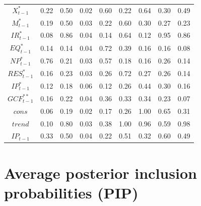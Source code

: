 \documentclass[a4paper, twoside]{templates/ociamthesis}
\begin{document}
\begin{table}[!ht]
\begin{tabular}[t]{ccccccccc}
$X^*_{t-1}$ & 0.22 & 0.50 & 0.02 & 0.60 & 0.22 & 0.64 & 0.30 & 0.49\\
$M^*_{t-1}$ & 0.19 & 0.50 & 0.03 & 0.22 & 0.60 & 0.30 & 0.27 & 0.23\\
$IR^*_{t-1}$ & 0.08 & 0.86 & 0.04 & 0.14 & 0.64 & 0.12 & 0.95 & 0.86\\
$EQ^*_{t-1}$ & 0.14 & 0.14 & 0.04 & 0.72 & 0.39 & 0.16 & 0.16 & 0.08\\
$NP^*_{t-1}$ & 0.76 & 0.21 & 0.03 & 0.57 & 0.18 & 0.16 & 0.26 & 0.14\\
$RES^*_{t-1}$ & 0.16 & 0.23 & 0.03 & 0.26 & 0.72 & 0.27 & 0.26 & 0.14\\
$IP^*_{t-1}$ & 0.12 & 0.18 & 0.06 & 0.12 & 0.26 & 0.44 & 0.30 & 0.16\\
$GCF^{**}_{t-1}$ & 0.16 & 0.22 & 0.04 & 0.36 & 0.33 & 0.34 & 0.23 & 0.07\\
$cons$ & 0.06 & 0.19 & 0.02 & 0.17 & 0.26 & 1.00 & 0.65 & 0.31\\
$trend$ & 0.10 & 0.80 & 0.03 & 0.38 & 1.00 & 0.96 & 0.59 & 0.98\\
$IP_{t-1}$ & 0.33 & 0.50 & 0.04 & 0.22 & 0.51 & 0.32 & 0.60 & 0.49\\
\bottomrule
\end{tabular}
\end{table}

\clearpage

\hypertarget{appendixdPIP}{%
\section{Average posterior inclusion probabilities (PIP)}\label{appendixdPIP}}
\end{document}
